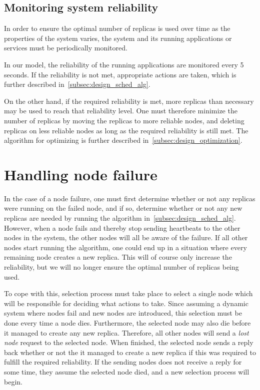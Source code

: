 \documentclass{cslthse-msc}
\begin{document}
\subsection{Monitoring system reliability} \label{subsec:monitoring_system_rel}
In order to ensure the optimal number of replicas is used over time as the properties of the system varies, the system and its running applications or services must be periodically monitored. 

In our model, the reliability of the running applications  are monitored every 5 seconds. If the reliability is not met, appropriate actions are taken, which is further described in~\cref{subsec:design_sched_alg}.

On the other hand, if the required reliability is met, more replicas than necessary may be used to reach that reliability level. One must therefore minimize the number of replicas by moving the replicas to more reliable nodes, and deleting replicas on less reliable nodes as long as the required reliability is still met. The algorithm for optimizing is further described in~\cref{subsec:design_optimization}.

\section{Handling node failure} \label{subsec:design_handling_failure}
In the case of a node failure, one must first determine whether or not any replicas were running on the failed node, and if so, determine whether or not any new replicas are needed by running the algorithm in~\cref{subsec:design_sched_alg}. However, when a node fails and thereby stop sending heartbeats to the other nodes in the system, the other nodes will all be aware of the failure. If all other nodes start running the algorithm, one could end up in a situation where every remaining node creates a new replica. This will of course only increase the reliability, but we will no longer ensure the optimal number of replicas being used. 

To cope with this, selection process must take place to select a single node which will be responsible for deciding what actions to take. Since assuming a dynamic system where nodes fail and new nodes are introduced, this selection must be done every time a node dies. Furthermore, the selected node may also die before it managed to create any new replica. Therefore, all other nodes will send a \emph{lost node} request to the selected node. When finished, the selected node sends a reply back whether or not the it managed to create a new replica if this was required to fulfill the required reliability. If the sending nodes does not receive a reply for some time, they assume the selected node died, and a new selection process will begin.
\end{document}
